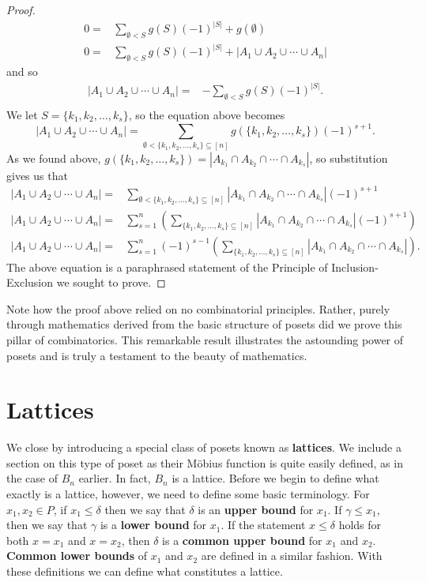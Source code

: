 \documentclass{article} %
\theoremstyle{definition}
\theoremstyle{plain}
\begin{document}
\begin{proof}
\begin{align*}
0=&\sum_{\emptyset < S}g(S)(-1)^{|S|}+g(\emptyset)\\
0=&\sum_{\emptyset < S}g(S)(-1)^{|S|}+\left|A_1\cup A_2 \cup \cdots \cup A_n\right|
\end{align*}
and so
\begin{align*}
\left|A_1\cup A_2 \cup \cdots \cup A_n\right|=&-\sum_{\emptyset < S}g(S)(-1)^{|S|}.\\
\end{align*}
We let $S=\{k_1,k_2,\ldots,k_s\}$, so the equation above becomes
$$|A_1\cup A_2\cup \cdots \cup A_n|=\sum_{\emptyset<\{k_1,k_2,\ldots,k_s\}\subseteq [n]}g(\{k_1,k_2,\ldots,k_s\})(-1)^{s+1}.$$
As we found above, $g(\{k_1,k_2,\ldots,k_s\})=|A_{k_1}\cap A_{k_2}\cap \cdots \cap A_{k_s}|$, so substitution gives us that
\begin{align*}
|A_1\cup A_2\cup \cdots \cup A_n|=&\sum_{\emptyset<\{k_1,k_2,\ldots,k_s\}\subseteq [n]}|A_{k_1}\cap A_{k_2}\cap \cdots \cap A_{k_s}|(-1)^{s+1}\\
|A_1\cup A_2\cup \cdots \cup A_n|=&\sum_{s=1}^n\left(\sum_{\{k_1,k_2,\ldots,k_s\}\subseteq [n]}|A_{k_1}\cap A_{k_2}\cap \cdots \cap A_{k_s}|(-1)^{s+1}\right)\\
|A_1\cup A_2\cup \cdots \cup A_n|=&\sum_{s=1}^n(-1)^{s-1}\left(\sum_{\{k_1,k_2,\ldots,k_s\}\subseteq [n]}|A_{k_1}\cap A_{k_2}\cap \cdots \cap A_{k_s}|\right).
\end{align*}
The above equation is a paraphrased statement of the Principle of Inclusion-Exclusion we sought to prove.
\end{proof}
Note how the proof above relied on no combinatorial principles. Rather, purely through mathematics derived from the basic structure of posets did we prove this pillar of combinatorics. This remarkable result illustrates the astounding power of posets and is truly a testament to the beauty of mathematics.

\section{Lattices} %
We close by introducing a special class of posets known as \textbf{lattices}. We include a section on this type of poset as their M\"{o}bius function is quite easily defined, as in the case of $B_n$ earlier. In fact, $B_n$ is a lattice. Before we begin to define what exactly is a lattice, however, we need to define some basic terminology. For $x_{1}, x_{2} \in P$, if $x_{1} \leq \delta$ then we say that $\delta$ is an \textbf{upper bound} for $x_{1}$. If $\gamma \leq x_{1}$, then we say that $\gamma$ is a \textbf{lower bound} for $x_{1}$. If the statement $x \leq \delta$ holds for both $x=x_{1}$ and $x=x_{2}$, then $\delta$ is a \textbf{common upper bound} for $x_{1}$ and $x_{2}$. \textbf{Common lower bounds} of $x_{1}$ and $x_{2}$ are defined in a similar fashion. With these definitions we can define what constitutes a lattice.\\
\end{document}
